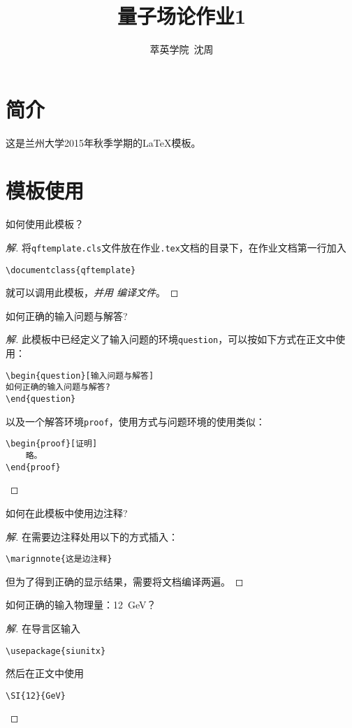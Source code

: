 \documentclass{qftemplate}
\author{萃英学院\ 沈周}
\title{量子场论作业1}
\begin{document}
\maketitle
\section{简介}
这是兰州大学2015年秋季学期的\LaTeX 模板。
\section{模板使用}
\begin{question}
如何使用此模板？
\end{question}
\begin{proof}[解]
    将{\tt qftemplate.cls}文件放在作业{\tt .tex}文档的目录下，在作业文档第一行加入
    \begin{verbatim}
\documentclass{qftemplate}
    \end{verbatim}
    就可以调用此模板，{\it 并用 \XeLaTeX 编译文件}。
\end{proof}

\begin{question}[输入问题与解答]
如何正确的输入问题与解答?
\end{question}
\begin{proof}[解]
    此模板中已经定义了输入问题的环境{\tt question}，可以按如下方式在正文中使用：
\begin{verbatim}
\begin{question}[输入问题与解答]
如何正确的输入问题与解答?
\end{question}
\end{verbatim}
以及一个解答环境{\tt proof}，使用方式与问题环境的使用类似：
\begin{verbatim}
\begin{proof}[证明]
    略。
\end{proof}
\end{verbatim}
\end{proof}

\begin{question}[边注释]
    如何在此模板中使用边注释?
\end{question}
\begin{proof}[解]
    在需要边注释处用以下的方式插入：
\begin{verbatim}
\marignnote{这是边注释}
\end{verbatim}
但为了得到正确的显示结果，需要将文档编译两遍。
\end{proof}

\begin{question}[输入单位]
如何正确的输入物理量：\SI{12}{GeV}？
\end{question}
\begin{proof}[解]
    在导言区输入
\begin{verbatim}
\usepackage{siunitx}
\end{verbatim}
然后在正文中使用
\begin{verbatim}
\SI{12}{GeV}
\end{verbatim}
\end{proof}
\end{document}

